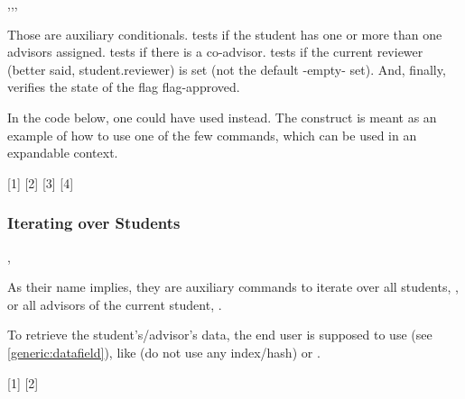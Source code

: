 \documentclass[10pt]{article}
\begin{document}
\begin{codedescribe}{\studentcase,\studentadvcase,\studentcoadvcase,\studentreviewersetcase}
\begin{codesyntax}
\end{codesyntax}
 Those are auxiliary conditionals. \tsobj{\studentAdvCase} tests if the student has one or more than one advisors assigned. \tsobj{\studentCoadvCase} tests if there is a co-advisor. \tsobj{\studentReviewerSetCase} tests if the current reviewer (better said, student.reviewer) is set (not the default -empty- set). And, finally, \tsobj{\studentCase} verifies the state of the flag flag-approved.
\end{codedescribe}
\begin{tsremark}
  In the code below, one could have used  instead. The construct is meant as an example of how to use one of the few  commands, which can be used in an expandable context.
\end{tsremark}

[1]
[2]
[3]
[4]


\subsubsection{Iterating over Students}

\begin{codedescribe}{\studentiterate,\studentadvisoriterate}
  \begin{codesyntax}
  \end{codesyntax}
  As their name implies, they are auxiliary commands to iterate over all students, \tsobj{\studentiterate}, or all advisors of the current student, \tsobj{\studentadvisoriterate}.
\end{codedescribe}
\begin{tsremark}
  To retrieve the student's/advisor's data, the end user is supposed to use \tsobj[code,sep=or]{\DataField,\DataGet} (see \ref{generic:datafield}), like  (do not use any index/hash) or .
\end{tsremark}
[1]
[2]
\end{document}
